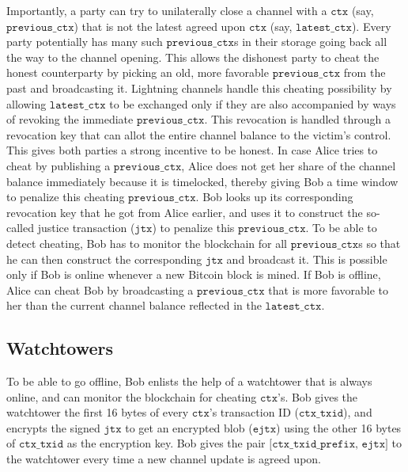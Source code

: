 Importantly, a party can try to unilaterally close a channel with a $\texttt{ctx}$ (say, $\texttt{previous\_ctx}$) that is not the latest agreed upon $\texttt{ctx}$ (say, $\texttt{latest\_ctx}$). Every party potentially has many such $\texttt{previous\_ctx}$s in their storage going back all the way to the channel opening. This allows the dishonest party to cheat the honest counterparty by picking an old, more favorable $\texttt{previous\_ctx}$ from the past and broadcasting it. Lightning channels handle this cheating possibility by allowing $\texttt{latest\_ctx}$ to be exchanged only if they are also accompanied by ways of revoking the immediate $\texttt{previous\_ctx}$. This revocation is handled through a revocation key that can allot the entire channel balance to the victim's control. This gives both parties a strong incentive to be honest. In case Alice tries to cheat by publishing a $\texttt{previous\_ctx}$, Alice does not get her share of the channel balance immediately because it is timelocked, thereby giving Bob a time window to penalize this cheating $\texttt{previous\_ctx}$. Bob looks up its corresponding revocation key that he got from Alice earlier, and uses it to construct the so-called justice transaction ($\texttt{jtx}$) to penalize this $\texttt{previous\_ctx}$. To be able to detect cheating, Bob has to monitor the blockchain for all $\texttt{previous\_ctx}$s so that he can then construct the corresponding $\texttt{jtx}$ and broadcast it. This is possible only if Bob is online whenever a new Bitcoin block is mined. If Bob is offline, Alice can cheat Bob by broadcasting a $\texttt{previous\_ctx}$ that is more favorable to her than the current channel balance reflected in the $\texttt{latest\_ctx}$. 

\label{watchtowers}
\subsection{Watchtowers}

To be able to go offline, Bob enlists the help of a watchtower that is always online, and can monitor the blockchain for cheating $\texttt{ctx}$'s. Bob gives the watchtower the first 16 bytes of every $\texttt{ctx}$'s transaction ID ($\texttt{ctx\_txid}$), and encrypts the signed $\texttt{jtx}$ to get an encrypted blob ($\texttt{ejtx}$) using the other 16 bytes of $\texttt{ctx\_txid}$ as the encryption key. Bob gives the pair $\texttt{[ctx\_txid\_prefix, ejtx]}$ to the watchtower every time a new channel update is agreed upon. 

